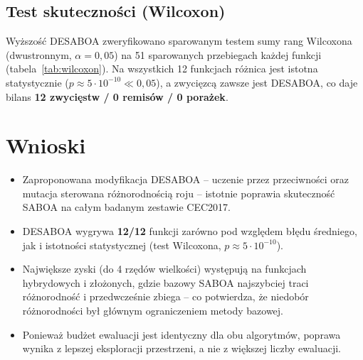 \documentclass[12pt]{article}
\begin{document}
\subsection{Test skuteczności (Wilcoxon)}
Wyższość DESABOA zweryfikowano sparowanym testem sumy rang Wilcoxona (dwustronnym,
$\alpha=0{,}05$) na 51 sparowanych przebiegach każdej funkcji (tabela~\ref{tab:wilcoxon}).
Na wszystkich 12 funkcjach różnica jest istotna statystycznie
($p\approx 5\cdot10^{-10} \ll 0{,}05$), a zwycięzcą zawsze jest DESABOA, co daje bilans
\textbf{12 zwycięstw / 0 remisów / 0 porażek}.



\section{Wnioski}
\begin{itemize}
  \item Zaproponowana modyfikacja DESABOA -- uczenie przez przeciwności oraz mutacja
        sterowana różnorodnością roju -- istotnie poprawia skuteczność SABOA na całym
        badanym zestawie CEC2017.
  \item DESABOA wygrywa \textbf{12/12} funkcji zarówno pod względem błędu średniego, jak i
        istotności statystycznej (test Wilcoxona, $p\approx 5\cdot10^{-10}$).
  \item Największe zyski (do 4 rzędów wielkości) występują na funkcjach hybrydowych i
        złożonych, gdzie bazowy SABOA najszybciej traci różnorodność i przedwcześnie
        zbiega -- co potwierdza, że niedobór różnorodności był głównym ograniczeniem
        metody bazowej.
  \item Ponieważ budżet ewaluacji jest identyczny dla obu algorytmów, poprawa wynika
        z lepszej eksploracji przestrzeni, a nie z większej liczby ewaluacji.
\end{itemize}



\end{document}
